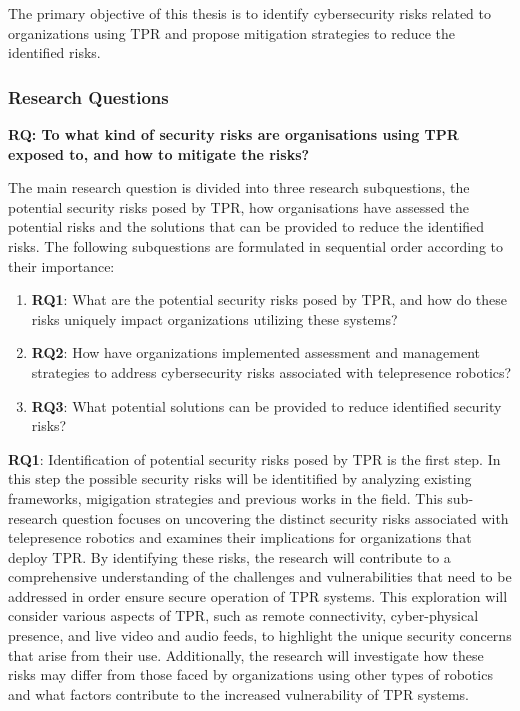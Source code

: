 The primary objective of this thesis is to identify cybersecurity risks related to organizations using \ac{TPR} and propose mitigation strategies to reduce the identified risks.

\subsubsection{Research Questions}

\textbf{RQ: To what kind of security risks are organisations using \ac{TPR} exposed to, and how to mitigate the risks?}


The main research question is divided into three research subquestions, the potential security risks posed by \ac{TPR}, how organisations
have assessed the potential risks and the solutions that can be provided to reduce the identified risks. The following subquestions are formulated
in sequential order according to their importance:

\begin{enumerate}
  \item\textbf{RQ1}: What are the potential security risks posed by \ac{TPR}, and how do these risks uniquely impact organizations utilizing these systems?
  \item\textbf{RQ2}: How have organizations implemented assessment and management strategies to address cybersecurity risks associated with telepresence robotics?
  \item\textbf{RQ3}: What potential solutions can be provided to reduce identified security risks?
\end{enumerate}

\textbf{RQ1}: Identification of potential security risks posed by \ac{TPR} is the first step. In this step the possible security risks will be identitified by analyzing existing frameworks, migigation strategies and previous works in the field. This sub-research question focuses on uncovering the distinct security risks associated with telepresence robotics and examines their implications for organizations that deploy \ac{TPR}.
  By identifying these risks, the research will contribute to a comprehensive understanding of the challenges and vulnerabilities that need to be addressed in order ensure secure operation of \ac{TPR} systems.
  This exploration will consider various aspects of \ac{TPR}, such as remote connectivity, cyber-physical presence, and live video and audio feeds, to highlight the unique security concerns that arise from their use.
  Additionally, the research will investigate how these risks may differ from those faced by organizations using other types of robotics and what factors contribute to the increased vulnerability of \ac{TPR} systems.

